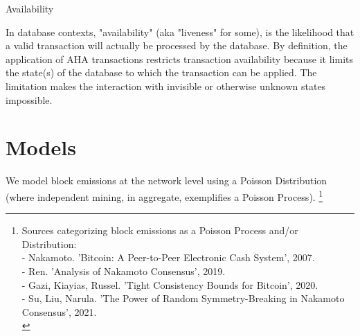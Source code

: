 \documentclass[11pt]{article}
\theoremstyle{plain}
\begin{document}
{Availability

In database contexts, "availability" (aka "liveness" for some), is the likelihood that a valid transaction
will actually be processed by the database.
By definition, the application of AHA transactions restricts transaction availability
because it limits the state(s) of the database to which the transaction can be applied.
The limitation makes the interaction with invisible or otherwise unknown states impossible.








\pagebreak
\section{\normalsize{Models}}\label{sec: models}

We model block emissions at the network level using a Poisson Distribution
(where independent mining, in aggregate, exemplifies a Poisson Process).\nolinebreak
\footnote{
Sources categorizing block emissions as a Poisson Process and/or Distribution: \\
    - Nakamoto. 'Bitcoin: A Peer-to-Peer Electronic Cash System', 2007.\\
    - Ren. 'Analysis of Nakamoto Consensus', 2019.\\
    - Gazi, Kiayias, Russel. 'Tight Consistency Bounds for Bitcoin', 2020.\\
    - Su, Liu, Narula. 'The Power of Random Symmetry-Breaking in Nakamoto Consensus', 2021.\\
}

}
\end{document}
